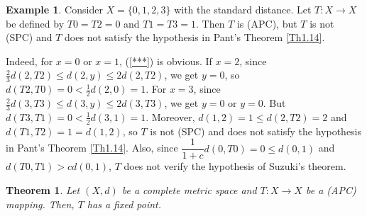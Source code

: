 \documentclass[12 pt]{article}
\theoremstyle{lema}
\theoremstyle{proposition}
\theoremstyle{theorem}
\newtheorem{theorem}{Theorem}[section]
\theoremstyle{theorem}
\theoremstyle{corollary}
\theoremstyle{definition}
\theoremstyle{example}
\newtheorem{example}{Example}[section]
\begin{document}
	\begin{example}
		Consider $X = \{0,1,2,3\}$ with the standard distance. Let \(T : X \to X \) be defined by \(T0=T2= 0\) and \(T1=T3=1\). Then \(T\) is (APC), but \(T\) is not (SPC) and \(T\) does not satisfy the hypothesis in Pant's Theorem \ref{Th1.14}.
		
		Indeed, for \(x=0\) or \(x=1\), (\ref{***}) is obvious. If \(x=2\), since \(\frac23 d(2,T2) \leq d(2,y) \leq 2d(2,T2)\), we get \(y=0\), so \(d(T2,T0)=0 < \frac12 d(2,0) = 1\). For \(x=3\), since \(\frac23 d(3,T3) \leq d(3,y) \leq 2d(3,T3)\), we get \(y=0\) or \(y=0\). But \(d(T3,T1)=0 < \frac12 d(3,1) = 1\). Moreover, \(d(1,2) = 1 \leq d(2,T2) = 2\) and \(d(T1,T2)=1=d(1,2)\), so \(T\) is not (SPC) and does not satisfy the hypothesis in Pant's Theorem \ref{Th1.14}. Also, since \(\dfrac{1}{1+c}d(0,T0) = 0 \leq d(0,1)\) and \(d(T0,T1) > cd(0,1)\), \(T\) does not verify the hypothesis of Suzuki's theorem.

	\end{example}

	\begin{theorem}
		Let \((X,d)\) be a complete metric space and \(T : X \to X \) be a (APC) mapping. Then, \(T\) has a fixed point.
	\end{theorem}
	
\end{document}

